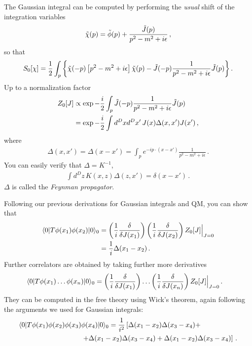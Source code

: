 The Gaussian integral can be computed by performing the {\em usual}
shift of the integration variables
\[
  \tilde{\chi}(p) = \tilde{\phi}(p) + \frac{\tilde{J}(p)}{p^2-m^2+i\epsilon}\, ,
\]
so that
\begin{align}
  S_0[\chi] = 
  \frac12 \int_p \bigg\{
  \tilde{\chi}(-p) \left[p^2-m^2+i\epsilon\right] \tilde{\chi}(p)
  - \tilde{J}(-p) \frac{1}{p^2-m^2+i\epsilon} \tilde{J}(p)
  \bigg\} \,.
\end{align}
Up to a normalization factor
\begin{align}
  Z_0[J] &\propto \exp -\frac{i}{2} \int_p \tilde{J}(-p)
           \frac{1}{p^2-m^2+i\epsilon} \tilde{J}(p) \\
  &= \exp -\frac{i}{2} \int d^Dx d^Dx'\,  J(x) \Delta(x,x') J(x') \, ,
\end{align}
where
\begin{align}
  \Delta(x,x') = \Delta(x-x') = 
  \int_p e^{-i p\cdot (x-x')} \frac{1}{p^2-m^2+i\epsilon}\, .
\end{align}
You can easily verify that $\Delta=K^{-1}$, \ie
\begin{align}
  \int d^Dz \, K(x,z) \Delta(z,x') = \delta(x-x')\, .
\end{align}
$\Delta$ is called the {\em Feynman propagator}.

Following our previous derivations for Gaussian integrals and QM, you
can show that
 \begin{align}
   \langle 0 | T \phi(x_1) \phi(x_2) | 0 \rangle_0 &= 
   \left(\frac{1}{i} \frac{\delta}{\delta J(x_1)}\right)
   \left(\frac{1}{i} \frac{\delta}{\delta J(x_2)}\right)
   Z_0[J]\Big|_{J=0} \\ 
   &= \frac{1}{i} \Delta(x_1-x_2)\, .
 \end{align}
Further correlators are obtained by taking further more derivatives
\begin{align}
  \langle 0 | T \phi(x_1) \ldots \phi(x_n) | 0 \rangle_0 
  &= 
    \left(\frac{1}{i} \frac{\delta}{\delta J(x_1)}\right)
    \ldots
    \left(\frac{1}{i} \frac{\delta}{\delta J(x_n)}\right)
    Z_0[J]\Big|_{J=0} \, .
\end{align}
They can be computed in the free theory using Wick's theorem, again
following the arguments we used for Gaussian integrals: 
\begin{align}
  \langle 0 | T \phi(x_1) \phi(x_2) \phi(x_3) 
  &\phi(x_4) | 0 \rangle_0 
    = \frac{1}{i^2} \left[
    \Delta(x_1-x_2) \Delta(x_3-x_4) + \right. \nonumber \\
  & \left. + \Delta(x_1-x_2) \Delta(x_3-x_4) + 
    \Delta(x_1-x_2) \Delta(x_3-x_4)
    \right]\, .
\end{align}

